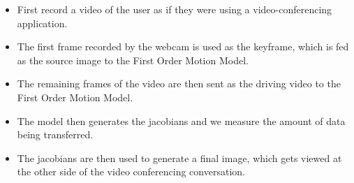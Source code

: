 \begin{itemize}
    \item First record a video of the user as if they were using a video-conferencing application. 
    \item The first frame recorded by the webcam is used as the keyframe, which is fed as the source image to the First Order Motion Model.
    \item The remaining frames of the video are then sent as the driving video to the First Order Motion Model.
    \item The model then generates the jacobians and we measure the amount of data being transferred.
    \item The jacobians are then used to generate a final image, which gets viewed at the other side of the video conferencing conversation.
\end{itemize}